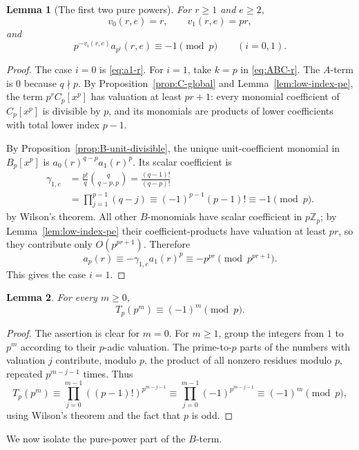 \documentclass[11pt]{amsart}
\numberwithin{equation}{section}
\newtheorem{lemma}[lemma]{Lemma}
\newcommand{\Zp}{\mathbb{Z}_p}
\newcommand{\Tp}{T_p}
\begin{document}
\begin{lemma}[The first two pure powers]\label{lem:first-two-pure-pe}
For $r\ge1$ and $e\ge2$,
\[
        v_0(r,e)=r,
        \qquad
        v_1(r,e)=pr,
\]
and
\[
        p^{-v_i(r,e)}a_{p^i}(r,e)\equiv -1\pmod p
        \qquad (i=0,1).
\]
\end{lemma}
\begin{proof}
The case $i=0$ is \eqref{eq:a1-r}.  For $i=1$, take $k=p$ in \eqref{eq:ABC-r}.  The $A$-term is $0$ because $q\nmid p$.  By Proposition~\ref{prop:C-global} and Lemma~\ref{lem:low-index-pe}, the term $p^rC_p[x^p]$ has valuation at least $pr+1$: every monomial coefficient of $C_p[x^p]$ is divisible by $p$, and its monomials are products of lower coefficients with total lower index $p-1$.

By Proposition~\ref{prop:B-unit-divisible}, the unique unit-coefficient monomial in $B_p[x^p]$ is $a_0(r)^{q-p}a_1(r)^p$.  Its scalar coefficient is
\[
\begin{aligned}
        \gamma_{1,e}
        &=\frac{p!}{q}\binom{q}{q-p,p}
         =\frac{(q-1)!}{(q-p)!} \\
        &=\prod_{j=1}^{p-1}(q-j)
         \equiv (-1)^{p-1}(p-1)!
         \equiv -1\pmod p.
\end{aligned}
\]
by Wilson's theorem.  All other $B$-monomials have scalar coefficient in $p\Zp$; by Lemma~\ref{lem:low-index-pe} their coefficient-products have valuation at least $pr$, so they contribute only $O(p^{pr+1})$.  Therefore
\[
        a_p(r)\equiv -\gamma_{1,e}a_1(r)^p\equiv -p^{pr}\pmod{p^{pr+1}}.
\]
This gives the case $i=1$.
\end{proof}

\begin{lemma}\label{lem:Tp-power-pe}
For every $m\ge0$,
\[
        \Tp(p^m)\equiv (-1)^m\pmod p.
\]
\end{lemma}
\begin{proof}
The assertion is clear for $m=0$.  For $m\ge1$, group the integers from $1$ to $p^m$ according to their $p$-adic valuation.  The prime-to-$p$ parts of the numbers with valuation $j$ contribute, modulo $p$, the product of all nonzero residues modulo $p$, repeated $p^{m-j-1}$ times.  Thus
\[
        \Tp(p^m)\equiv \prod_{j=0}^{m-1}((p-1)!)^{p^{m-j-1}}
        \equiv \prod_{j=0}^{m-1}(-1)^{p^{m-j-1}}
        \equiv (-1)^m\pmod p,
\]
using Wilson's theorem and the fact that $p$ is odd.
\end{proof}

We now isolate the pure-power part of the $B$-term.
\end{document}
